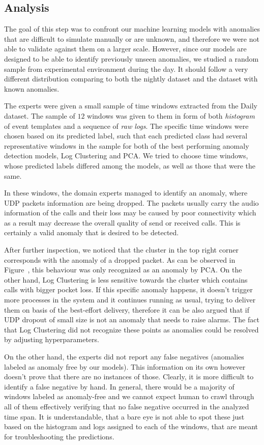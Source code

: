 \subsection{Analysis}
The goal of this step was to confront our machine learning models with anomalies that are difficult to simulate manually or are unknown, and therefore we were not able to validate against them on a larger scale. However, since our models are designed to be able to identify previously unseen anomalies, we studied a random sample from experimental environment during the day. It should follow a very different distribution comparing to both the nightly dataset and the dataset with known anomalies.

The experts were given a small sample of time windows extracted from the Daily dataset. The sample of $12$ windows was given to them in form of both \textit{histogram} of event templates and a sequence of \textit{raw logs}. The specific time windows were chosen based on its predicted label, such that each predicted class had several representative windows in the sample for both of the best performing anomaly detection models, Log Clustering and PCA. We tried to choose time windows, whose predicted labels differed among the models, as well as those that were the same.

In these windows, the domain experts managed to identify an anomaly, where UDP packets information are being dropped. The packets usually carry the audio information of the calls and their loss may be caused by poor connectivity which as a result may decrease the overall quality of send or received calls.  This is certainly a valid anomaly that is desired to be detected. 

After further inspection, we noticed that the cluster in the top right corner corresponds with the anomaly of a dropped packet. As can be observed in Figure~\label{fig:tsne-unslabeled-plots}, this behaviour was only recognized as an anomaly by PCA. On the other hand, Log Clustering is less sensitive towards the cluster which contains calls with bigger pocket loss. If this specific anomaly happens, it doesn't trigger more processes in the system and it continues running as usual, trying to deliver them on basis of the best-effort delivery, therefore it can be also argued that if UDP dropout of small size is not an anomaly that needs to raise alarms. The fact that Log Clustering did not recognize these points as anomalies could be resolved by adjusting hyperparameters.

On the other hand, the experts did not report any false negatives (anomalies labeled as anomaly free by our models). This information on its own however doesn't prove that there are no instances of those.
Clearly, it is more difficult to identify a false negative by hand. In general, there would be a majority of windows labeled as anomaly-free and we cannot expect human to crawl through all of them effectively verifying that no false negative occurred in the analyzed time span. It is understandable, that a bare eye is not able to spot these just based on the histogram and logs assigned to each of the windows, that are meant for troubleshooting the predictions.